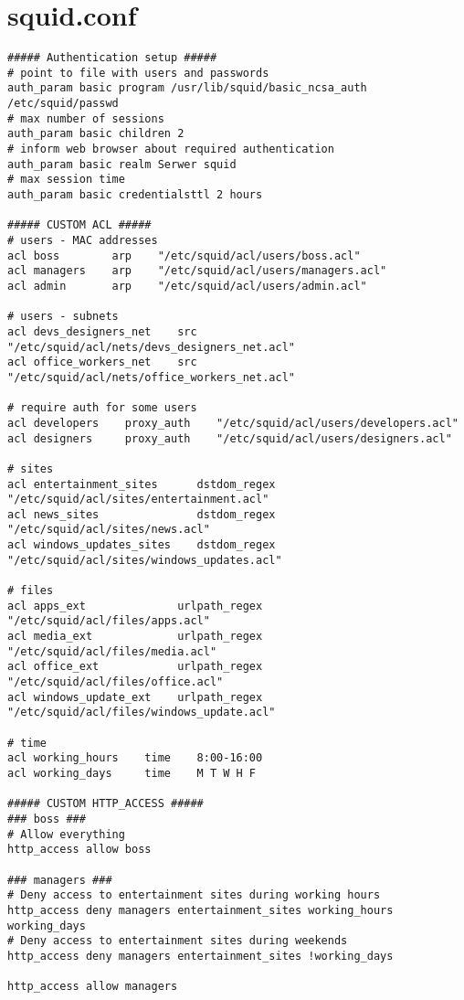 \documentclass{article}
\begin{document}
\section{squid.conf}
\begin{lstlisting}[caption=Zmiany w pliku squid.conf \label{lst:squid-conf}]
##### Authentication setup #####
# point to file with users and passwords
auth_param basic program /usr/lib/squid/basic_ncsa_auth /etc/squid/passwd
# max number of sessions
auth_param basic children 2
# inform web browser about required authentication
auth_param basic realm Serwer squid
# max session time
auth_param basic credentialsttl 2 hours

##### CUSTOM ACL #####
# users - MAC addresses
acl boss        arp    "/etc/squid/acl/users/boss.acl"
acl managers    arp    "/etc/squid/acl/users/managers.acl"
acl admin       arp    "/etc/squid/acl/users/admin.acl"

# users - subnets
acl devs_designers_net    src    "/etc/squid/acl/nets/devs_designers_net.acl"
acl office_workers_net    src    "/etc/squid/acl/nets/office_workers_net.acl"

# require auth for some users
acl developers    proxy_auth    "/etc/squid/acl/users/developers.acl"
acl designers     proxy_auth    "/etc/squid/acl/users/designers.acl"

# sites
acl entertainment_sites      dstdom_regex    "/etc/squid/acl/sites/entertainment.acl"
acl news_sites               dstdom_regex    "/etc/squid/acl/sites/news.acl"
acl windows_updates_sites    dstdom_regex    "/etc/squid/acl/sites/windows_updates.acl"

# files
acl apps_ext              urlpath_regex    "/etc/squid/acl/files/apps.acl"
acl media_ext             urlpath_regex    "/etc/squid/acl/files/media.acl"
acl office_ext            urlpath_regex    "/etc/squid/acl/files/office.acl"
acl windows_update_ext    urlpath_regex    "/etc/squid/acl/files/windows_update.acl"

# time
acl working_hours    time    8:00-16:00
acl working_days     time    M T W H F

##### CUSTOM HTTP_ACCESS #####
### boss ###
# Allow everything
http_access allow boss

### managers ###
# Deny access to entertainment sites during working hours
http_access deny managers entertainment_sites working_hours working_days
# Deny access to entertainment sites during weekends
http_access deny managers entertainment_sites !working_days

http_access allow managers


\end{lstlisting}
\end{document}
